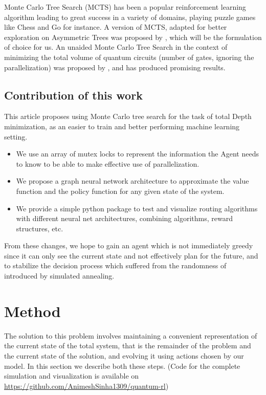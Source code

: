 \documentclass[%
 reprint,
 amsmath,amssymb,
 aps,
]{revtex4-2}
\begin{document}
Monte Carlo Tree Search (MCTS) has been a popular reinforcement learning algorithm \citep{mcts_bandits_0, mcts_bandits_1, mcts_uct} leading to great success in a variety of domains, playing puzzle games like Chess and Go \citep{mcts_alphago} for instance.
A version of MCTS, adapted for better exploration on Asymmetric Trees was proposed by \citet{mcts_assymetric}, which will be the formulation of choice for us.
An unaided Monte Carlo Tree Search in the context of minimizing the total volume of quantum circuits (number of gates, ignoring the parallelization) was proposed by \citet{qroute_mcts}, and has produced promising results.

\subsection{\label{sec:intro-contribution}Contribution of this work}

This article proposes using Monte Carlo tree search for the task of total Depth minimization, as an easier to train and better performing machine learning setting.
\begin{itemize}
    \item We use an array of mutex locks to represent the information the Agent needs to know to be able to make effective use of parallelization.
    \item We propose a graph neural network architecture to approximate the value function and the policy function for any given state of the system.
    \item We provide a simple python package to test and visualize routing algorithms with different neural net architectures, combining algorithms, reward structures, etc.
\end{itemize}
From these changes, we hope to gain an agent which is not immediately greedy since it can only see the current state and not effectively plan for the future, and to stabilize the decision process which suffered from the randomness of introduced by simulated annealing.


\section{\label{sec:method}Method}

The solution to this problem involves maintaining a convenient representation of the current state of the total system, that is the remainder of the problem and the current state of the solution, and evolving it using actions chosen by our model. In this section we describe both these steps. (Code for the complete simulation and visualization is available on \url{https://github.com/AnimeshSinha1309/quantum-rl})
\end{document}
